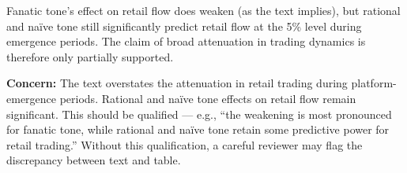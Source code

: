 \documentclass[11pt]{article}
\newcommand{\concern}[1]{\textcolor{concern}{\textbf{Concern:} #1}}
\begin{document}
Fanatic tone's effect on retail flow does weaken (as the text implies),
but rational and na\"{i}ve tone still significantly predict retail flow
at the 5\% level during emergence periods. The claim of broad attenuation
in trading dynamics is therefore only partially supported.

\concern{The text overstates the attenuation in retail trading during
platform-emergence periods. Rational and na\"{i}ve tone effects on retail
flow remain significant. This should be qualified --- e.g., ``the
weakening is most pronounced for fanatic tone, while rational and na\"{i}ve
tone retain some predictive power for retail trading.'' Without this
qualification, a careful reviewer may flag the discrepancy between text
and table.}
\end{document}
